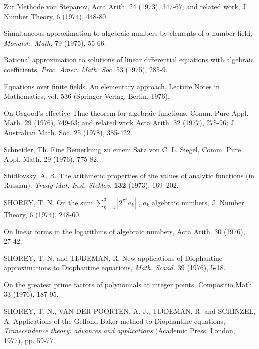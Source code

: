 \begin{hanglist}
    \item \hspace{1.5em} Zur Methode von Stepanov, Acta Arith. 24 (1973), 347-67; and related work, J. Number Theory, 6 (1974), 448-80.
    \item \hspace{1.5em} Simultaneous approximation to algebraic numbers by elements of a number field, \textit{Monatsh. Math.} 79 (1975), 55-66.
    \item \hspace{1.5em} Rational approximation to solutions of linear differential equations with algebraic coefficients, \textit{Proc. Amer. Math. Soc.} 53 (1975), 285-9.
    \item \hspace{1.5em} Equations over finite fields. An elementary approach, Lecture Notes in Mathematics, vol. 536 (Springer-Verlag, Berlin, 1976).
    \item \hspace{1.5em} On Osgood's effective Thue theorem for algebraic functions. Comm. Pure Appl. Math. 29 (1976), 749-63; and related work Acta Arith. 32 (1977), 275-96; J. Australian Math. Soc. 25 (1978), 385-422.
    \item Schneider, Th. Eine Bemerkung zu einem Satz von C. L. Siegel, Comm. Pure Appl. Math. 29 (1976), 775-82.
    \item Shidlovsky, A. B. The arithmetic properties of the values of analytic functions (in Russian). \textit{Trudy Mat. Inst. Steklov}, \textbf{132} (1973), 169–202.
    \item SHOREY, T. N. On the sum  $\sum_{k=1}^{3} |2^{\pi^k} a_k|$ ,  $a_k$  algebraic numbers, J. Number Theory, 6 (1974), 248-60.
    \item On linear forms in the logarithms of algebraic numbers, Acta Arith. 30 (1976), 27-42.
    \item SHOREY, T. N. and TIJDEMAN, R. New applications of Diophantine approximations to Diophantine equations, \textit{Math. Scand.} 39 (1976), 5-18.
    \item \hspace{1.5em} On the greatest prime factors of polynomials at integer points, Compositio Math. 33 (1976), 187-95.
    \item SHOREY, T. N., VAN DER POORTEN, A. J., TIJDEMAN, R. and SCHINZEL, A. Applications of the Gelfond-Baker method to Diophantine equations, \textit{Transcendence theory: advances and applications} (Academic Press, London, 1977), pp. 59-77.

\end{hanglist}
